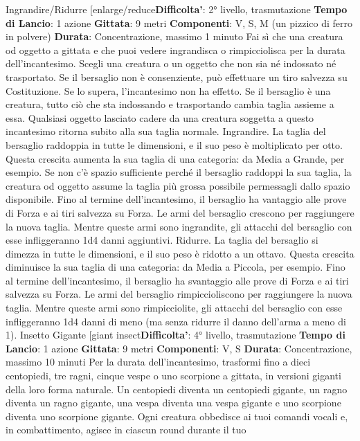 \begin{multicols}{2}
Ingrandire/Ridurre
[enlarge/reduce\textbf{Difficolta'}:
2° livello, trasmutazione
\textbf{Tempo di Lancio}: 1 azione
\textbf{Gittata}: 9 metri
\textbf{Componenti}: V, S, M (un pizzico di ferro in polvere)
\textbf{Durata}: Concentrazione, massimo 1 minuto
Fai sì che una creatura od oggetto a gittata e che puoi
vedere ingrandisca o rimpicciolisca per la durata
dell’incantesimo. Scegli una creatura o un oggetto che
non sia né indossato né trasportato. Se il bersaglio non
è consenziente, può effettuare un tiro salvezza su
Costituzione. Se lo supera, l’incantesimo non ha effetto.
Se il bersaglio è una creatura, tutto ciò che sta
indossando e trasportando cambia taglia assieme a
essa. Qualsiasi oggetto lasciato cadere da una creatura
soggetta a questo incantesimo ritorna subito alla sua
taglia normale.
Ingrandire. La taglia del bersaglio raddoppia in tutte le
dimensioni, e il suo peso è moltiplicato per otto. Questa
crescita aumenta la sua taglia di una categoria: da
Media a Grande, per esempio. Se non c’è spazio
sufficiente perché il bersaglio raddoppi la sua taglia, la
creatura od oggetto assume la taglia più grossa
possibile permessagli dallo spazio disponibile. Fino al
termine dell’incantesimo, il bersaglio ha vantaggio alle
prove di Forza e ai tiri salvezza su Forza. Le armi del
bersaglio crescono per raggiungere la nuova taglia.
Mentre queste armi sono ingrandite, gli attacchi del
bersaglio con esse infliggeranno 1d4 danni aggiuntivi.
Ridurre. La taglia del bersaglio si dimezza in tutte le
dimensioni, e il suo peso è ridotto a un ottavo. Questa
crescita diminuisce la sua taglia di una categoria: da
Media a Piccola, per esempio. Fino al termine
dell’incantesimo, il bersaglio ha svantaggio alle prove di
Forza e ai tiri salvezza su Forza. Le armi del bersaglio
rimpiccioliscono per raggiungere la nuova taglia. Mentre
queste armi sono rimpicciolite, gli attacchi del bersaglio
con esse infliggeranno 1d4 danni di meno (ma senza
ridurre il danno dell’arma a meno di 1).
Insetto Gigante
[giant insect\textbf{Difficolta'}:
4° livello, trasmutazione
\textbf{Tempo di Lancio}: 1 azione
\textbf{Gittata}: 9 metri
\textbf{Componenti}: V, S
\textbf{Durata}: Concentrazione, massimo 10 minuti
Per la durata dell’incantesimo, trasformi fino a dieci
centopiedi, tre ragni, cinque vespe o uno scorpione a
gittata, in versioni giganti della loro forma naturale. Un
centopiedi diventa un centopiedi gigante, un ragno
diventa un ragno gigante, una vespa diventa una vespa
gigante e uno scorpione diventa uno scorpione gigante.
Ogni creatura obbedisce ai tuoi comandi vocali e, in
combattimento, agisce in ciascun round durante il tuo

\end{multicols}
